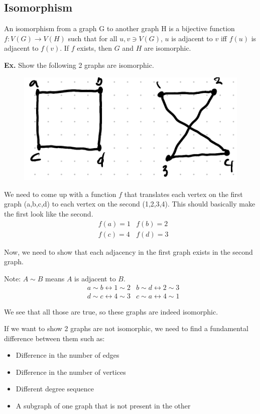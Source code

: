 \documentclass[12pt,letterpaper]{article} \usepackage{amsmath} \usepackage{graphicx}  \usepackage{longtable}  \usepackage{amssymb}
\begin{document}
        \subsection{Isomorphism}
        An isomorphism from a graph G to another graph H is a bijective function $f:V(G)\rightarrow V(H)$ such that for all $u, v \ni V(G)$, $u$ is adjacent to $v$ iff $f(u)$ is adjacent to $f(v)$. If $f$ exists, then $G$ and $H$ are isomorphic. 

        \begin{mdframed}
            \textbf{Ex. } Show the following 2 graphs are isomorphic. 

            \begin{figure}[H]
                \centering
                \includegraphics[width=0.3\linewidth]{ex9.png}
            \end{figure}

            We need to come up with a function $f$ that translates each vertex on the first graph (a,b,c,d) to each vertex on the second (1,2,3,4). This should basically make the first look like the second. 
            \begin{align*}
                & f(a) = 1 & f(b) = 2 \\
                & f(c) = 4 & f(d) = 3
            \end{align*}

            Now, we need to show that each adjacency in the first graph exists in the second graph. 

            Note: $A \sim B$ means $A$ is adjacent to $B$.
            \begin{align*}
                & a\sim b \leftrightarrow 1\sim 2 & b\sim d \leftrightarrow 2\sim 3\\
                & d\sim c \leftrightarrow 4\sim 3 & c\sim a \leftrightarrow 4\sim 1
            \end{align*}

            We see that all those are true, so these graphs are indeed isomorphic. 

        \end{mdframed}

        If we want to show 2 graphs are not isomorphic, we need to find a fundamental difference between them such as:
        \begin{itemize}[noitemsep]
            \item Difference in the number of edges
            \item Difference in the number of vertices
            \item Different degree sequence
            \item A subgraph of one graph that is not present in the other
        \end{itemize}
\end{document}
